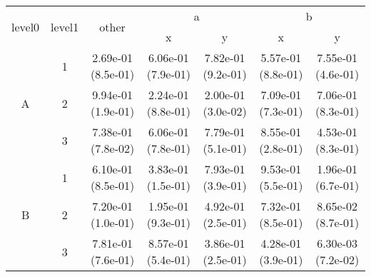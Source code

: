 \begin{tabular}{ccccccc}
\toprule
\multirow{2}{*}{level0} & \multirow{2}{*}{level1}& \multirow{2}{*}{other}&\multicolumn{2}{c}{a}&\multicolumn{2}{c}{b}\tabularnewline
\cmidrule(lr){4-5}
\cmidrule(lr){6-7}
&&&x&y&x&y\tabularnewline
\midrule
\multirow{3}{*}{A}&1& 2.69e-01 (8.5e-01)& 6.06e-01 (7.9e-01)& 7.82e-01 (9.2e-01)& 5.57e-01 (8.8e-01)& 7.55e-01 (4.6e-01)\tabularnewline
&2& 9.94e-01 (1.9e-01)& 2.24e-01 (8.8e-01)& 2.00e-01 (3.0e-02)& 7.09e-01 (7.3e-01)& 7.06e-01 (8.3e-01)\tabularnewline
&3& 7.38e-01 (7.8e-02)& 6.06e-01 (7.8e-01)& 7.79e-01 (5.1e-01)& 8.55e-01 (2.8e-01)& 4.53e-01 (8.3e-01)\tabularnewline
\midrule
\multirow{3}{*}{B}&1& 6.10e-01 (8.5e-01)& 3.83e-01 (1.5e-01)& 7.93e-01 (3.9e-01)& 9.53e-01 (5.5e-01)& 1.96e-01 (6.7e-01)\tabularnewline
&2& 7.20e-01 (1.0e-01)& 1.95e-01 (9.3e-01)& 4.92e-01 (2.5e-01)& 7.32e-01 (8.5e-01)& 8.65e-02 (8.7e-01)\tabularnewline
&3& 7.81e-01 (7.6e-01)& 8.57e-01 (5.4e-01)& 3.86e-01 (2.5e-01)& 4.28e-01 (3.9e-01)& 6.30e-03 (7.2e-02)\tabularnewline
\bottomrule
\end{tabular}
